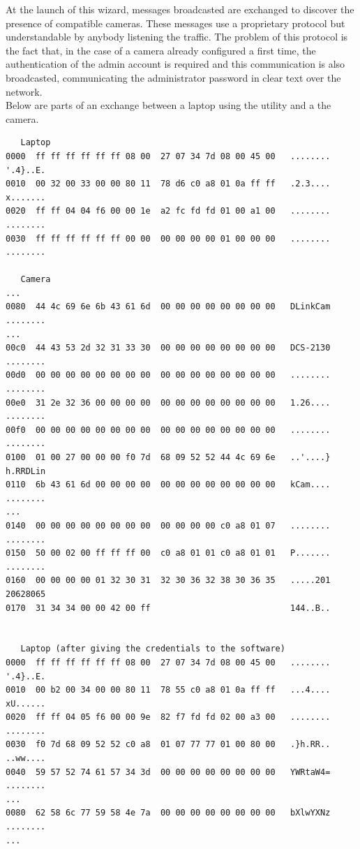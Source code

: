At the launch of this wizard, messages broadcasted are exchanged to discover the presence of compatible cameras.
These messages use a proprietary protocol but understandable by anybody listening the traffic.
The problem of this protocol is the fact that, in the case of a camera already configured a first time, the authentication of the admin account is required and this communication is also broadcasted, communicating the administrator password in clear text over the network.\\

Below are parts of an exchange between a laptop using the utility and a the camera.

{\small
\begin{verbatim}
   Laptop
0000  ff ff ff ff ff ff 08 00  27 07 34 7d 08 00 45 00   ........ '.4}..E.
0010  00 32 00 33 00 00 80 11  78 d6 c0 a8 01 0a ff ff   .2.3.... x.......
0020  ff ff 04 04 f6 00 00 1e  a2 fc fd fd 01 00 a1 00   ........ ........
0030  ff ff ff ff ff ff 00 00  00 00 00 00 01 00 00 00   ........ ........

   Camera
...
0080  44 4c 69 6e 6b 43 61 6d  00 00 00 00 00 00 00 00   DLinkCam ........
...
00c0  44 43 53 2d 32 31 33 30  00 00 00 00 00 00 00 00   DCS-2130 ........
00d0  00 00 00 00 00 00 00 00  00 00 00 00 00 00 00 00   ........ ........
00e0  31 2e 32 36 00 00 00 00  00 00 00 00 00 00 00 00   1.26.... ........
00f0  00 00 00 00 00 00 00 00  00 00 00 00 00 00 00 00   ........ ........
0100  01 00 27 00 00 00 f0 7d  68 09 52 52 44 4c 69 6e   ..'....} h.RRDLin
0110  6b 43 61 6d 00 00 00 00  00 00 00 00 00 00 00 00   kCam.... ........
...
0140  00 00 00 00 00 00 00 00  00 00 00 00 c0 a8 01 07   ........ ........
0150  50 00 02 00 ff ff ff 00  c0 a8 01 01 c0 a8 01 01   P....... ........
0160  00 00 00 00 01 32 30 31  32 30 36 32 38 30 36 35   .....201 20628065
0170  31 34 34 00 00 42 00 ff                            144..B..         


   Laptop (after giving the credentials to the software)
0000  ff ff ff ff ff ff 08 00  27 07 34 7d 08 00 45 00   ........ '.4}..E.
0010  00 b2 00 34 00 00 80 11  78 55 c0 a8 01 0a ff ff   ...4.... xU......
0020  ff ff 04 05 f6 00 00 9e  82 f7 fd fd 02 00 a3 00   ........ ........
0030  f0 7d 68 09 52 52 c0 a8  01 07 77 77 01 00 80 00   .}h.RR.. ..ww....
0040  59 57 52 74 61 57 34 3d  00 00 00 00 00 00 00 00   YWRtaW4= ........
...
0080  62 58 6c 77 59 58 4e 7a  00 00 00 00 00 00 00 00   bXlwYXNz ........
...
\end{verbatim}
}

